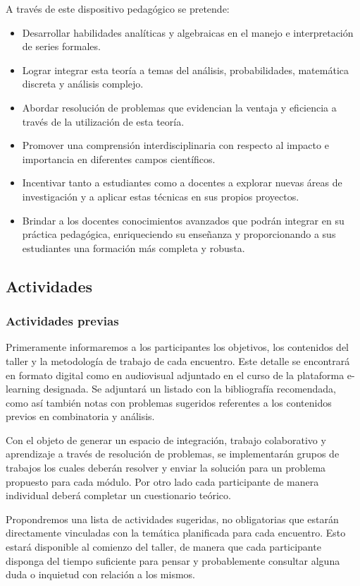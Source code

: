 A través de este dispositivo pedagógico se pretende:
\begin{itemize}
	\item Desarrollar habilidades analíticas y algebraicas en el manejo e interpretación de series formales.
	\item Lograr integrar esta teoría a temas del análisis, probabilidades, matemática discreta y análisis complejo.
	\item Abordar resolución de problemas que evidencian la ventaja y eficiencia a través de la utilización de esta teoría.
	\item Promover una comprensión interdisciplinaria con respecto al impacto e importancia en diferentes campos científicos.
	\item Incentivar tanto a estudiantes como a docentes a explorar nuevas áreas de investigación y a aplicar estas técnicas en sus propios proyectos.
	\item Brindar a los docentes conocimientos avanzados que podrán integrar en su práctica pedagógica, enriqueciendo su enseñanza y proporcionando a sus estudiantes una formación más completa y robusta.
\end{itemize}

\subsection{Actividades}

\subsubsection{Actividades previas}

Primeramente informaremos a los participantes los objetivos, los contenidos del taller y la metodología de trabajo de cada encuentro. Este detalle se encontrará en formato digital como en audiovisual adjuntado en el curso de la plataforma e-learning designada. Se adjuntará un listado con la bibliografía recomendada, como así también notas con problemas sugeridos referentes a los contenidos previos en combinatoria y análisis.

Con el objeto de generar un espacio de integración, trabajo colaborativo y aprendizaje a través de resolución de problemas, se implementarán grupos de trabajos los cuales deberán resolver y enviar la solución para un problema propuesto para cada módulo. Por otro lado cada participante de manera individual deberá completar un cuestionario teórico.

Propondremos una lista de actividades sugeridas, no obligatorias que estarán directamente vinculadas con la temática planificada para cada encuentro. Esto estará disponible al comienzo del taller, de manera que cada participante disponga del tiempo suficiente para pensar y probablemente consultar alguna duda o inquietud con relación a los mismos.

